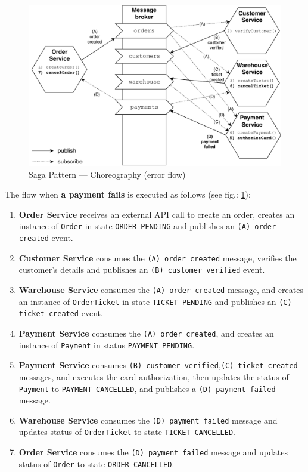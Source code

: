 \documentclass[thesis=M,english,hidelinks]{FITthesis}[2012/10/20]
\begin{document}
\begin{figure}[!ht]
  \centering
    \includegraphics[width=1\textwidth]{images/saga-chor-fail.pdf}
    \caption{Saga Pattern --- Choreography (error flow)}
    \label{fig:saga-chor-fail}
\end{figure}
\noindent
The flow when \textbf{a payment fails} is executed as follows (see fig.: \ref{fig:saga-chor-fail}):
\begin{enumerate}
    \item \textbf{Order Service} receives an external \acrshort{API} call to create an order, creates an instance of \texttt{Order} in state \texttt{ORDER PENDING} and publishes an \texttt{(A) order created} event.
    \item \textbf{Customer Service} consumes the \texttt{(A) order created} message, verifies the customer's details and publishes an \texttt{(B) customer verified} event.
    \item \textbf{Warehouse Service} consumes the \texttt{(A) order created} message, and creates an instance of \texttt{OrderTicket} in state \texttt{TICKET PENDING} and publishes an \texttt{(C) ticket created} event.
    \item \textbf{Payment Service} consumes the \texttt{(A) order created}, and creates an instance of \texttt{Payment} in status \texttt{PAYMENT PENDING}.
    \item \textbf{Payment Service} consumes \texttt{(B) customer verified},\break\texttt{(C) ticket created} messages, and executes the card authorization, then updates the status of \texttt{Payment} to \texttt{PAYMENT CANCELLED}, and publishes a \texttt{(D) payment failed} message.
    \item \textbf{Warehouse Service} consumes the \texttt{(D) payment failed} message and updates status of \texttt{OrderTicket} to state \texttt{TICKET CANCELLED}.
    \item \textbf{Order Service} consumes the \texttt{(D) payment failed} message and updates status of \texttt{Order} to state \texttt{ORDER CANCELLED}.
\end{enumerate}
\end{document}
